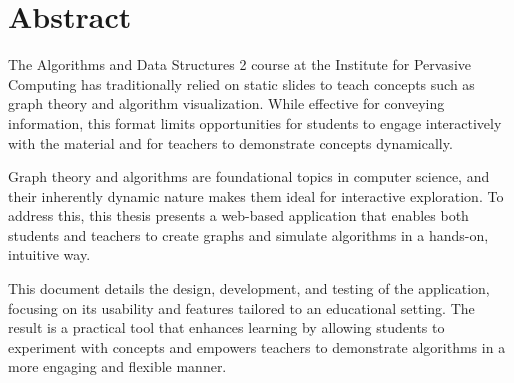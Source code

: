 \section*{Abstract}
\label{sec:abstract}
The Algorithms and Data Structures 2 course at the Institute for Pervasive Computing has traditionally relied on static slides to teach concepts such as graph theory and algorithm visualization. While effective for conveying information, this format limits opportunities for students to engage interactively with the material and for teachers to demonstrate concepts dynamically.

Graph theory and algorithms are foundational topics in computer science, and their inherently dynamic nature makes them ideal for interactive exploration. To address this, this thesis presents a web-based application that enables both students and teachers to create graphs and simulate algorithms in a hands-on, intuitive way.

This document details the design, development, and testing of the application, focusing on its usability and features tailored to an educational setting. The result is a practical tool that enhances learning by allowing students to experiment with concepts and empowers teachers to demonstrate algorithms in a more engaging and flexible manner.